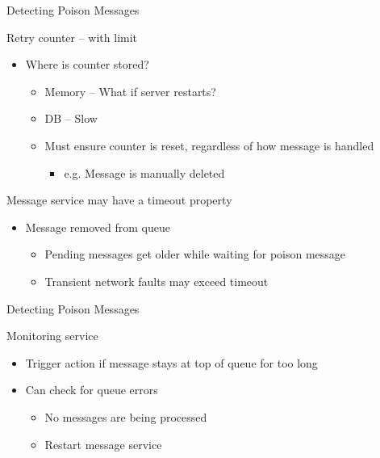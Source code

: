 \documentclass{slide}
\begin{document}
\begin{frame}{Detecting Poison Messages}
    \vspace{1mm}
    {\LARGE
        Retry counter -- with limit
        \begin{itemize}
            \Large\item Where is counter stored?
            \begin{itemize}
                \large\item Memory -- What if server restarts?
                \vspace{1mm}
                \large\item DB -- Slow
                \vspace{2mm}
                \large\item Must ensure counter is reset, regardless of how message is handled
                \begin{itemize}
                    \item e.g. Message is manually deleted
                \end{itemize}
            \end{itemize}
        \end{itemize}
        \pause
        \vspace{3mm}
        Message service may have a timeout property
        \begin{itemize}
            \Large\item Message removed from queue
            \begin{itemize}
                \large\item Pending messages get older while waiting for poison message
                \vspace{1mm}
                \large\item Transient network faults may exceed timeout
            \end{itemize}
        \end{itemize}
    }
\end{frame}

\begin{frame}{Detecting Poison Messages}
    \vspace{1mm}
    {\LARGE
        Monitoring service
        \begin{itemize}
            \Large\item Trigger action if message stays at top of queue for too long
            \vspace{2mm}
            \Large\item Can check for queue errors
            \begin{itemize}
                \large\item No messages are being processed
                \vspace{1mm}
                \large\item Restart message service
            \end{itemize}
        \end{itemize}
    }
\end{frame}
\end{document}

